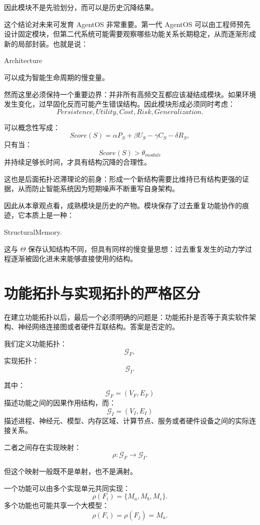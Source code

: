 因此模块不是先验划分，而可以是历史沉降结果。

这个结论对未来可发育 AgentOS 非常重要。第一代 AgentOS 可以由工程师预先设计固定模块，但第二代系统可能需要观察哪些功能关系长期稳定，从而逐渐形成新的局部封装。也就是说：
\begin{statementbox}
Architecture
\end{statementbox}
可以成为智能生命周期的慢变量。

然而这里必须保持一个重要边界：并非所有高频交互都应该凝结成模块。如果环境发生变化，过早固化反而可能产生错误结构。因此模块形成必须同时考虑：
\[
Persistence,
Utility,
Cost,
Risk,
Generalization.
\]

可以概念性写成：
\[
Score(S)
=
\alpha P_S
+
\beta U_S
-
\gamma C_S
-
\delta R_S,
\]
只有当：
\[
Score(S)>\theta_{module}
\]
并持续足够长时间，才具有结构沉降的合理性。

这也是后面拓扑迟滞理论的前身：形成一个新结构需要比维持已有结构更强的证据，从而防止智能系统因为短期噪声不断重写自身架构。

因此从本章观点看，成熟模块是历史的产物。模块保存了过去重复功能协作的痕迹，它本质上是一种：
\begin{statementbox}
StructuralMemory.
\end{statementbox}

这与 $\Theta$ 保存认知结构不同，但具有同样的慢变量思想：过去重复发生的动力学过程逐渐被固化进未来能够直接使用的结构。


\section{功能拓扑与实现拓扑的严格区分}

在建立功能拓扑以后，最后一个必须明确的问题是：功能拓扑是否等于真实软件架构、神经网络连接图或者硬件互联结构。答案是否定的。

我们定义功能拓扑：
\[
\mathcal G_F,
\]
实现拓扑：
\[
\mathcal G_I.
\]

其中：
\[
\mathcal G_F
=
(V_F,E_F)
\]
描述功能之间的因果作用结构，而：
\[
\mathcal G_I
=
(V_I,E_I)
\]
描述进程、神经元、模型、内存区域、计算节点、服务或者硬件设备之间的实际连接关系。

二者之间存在实现映射：
\[
\rho:
\mathcal G_F
\rightarrow
\mathcal G_I.
\]

但这个映射一般既不是单射，也不是满射。

一个功能可以由多个实现单元共同实现：
\[
\rho(F_i)
=
\{M_a,M_b,M_c\}.
\]
多个功能也可能共享一个大模型：
\[
\rho(F_i)
=
\rho(F_j)
=
M_a.
\]

